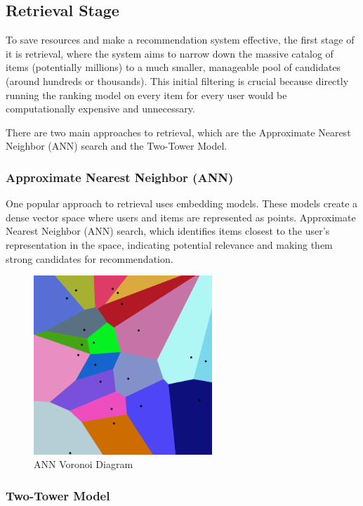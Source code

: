 \subsection{Retrieval Stage}

To save resources and make a recommendation system effective, the first stage of it is retrieval, 
where the system aims to narrow down the massive 
catalog of items (potentially millions) to a much smaller, 
manageable pool of candidates (around hundreds or thousands).
This initial filtering is crucial because 
directly running the ranking model on every item for every 
user would be computationally expensive and unnecessary.

There are two main approaches to retrieval, which are the Approximate Nearest Neighbor (ANN) search and the Two-Tower Model.

\subsubsection{Approximate Nearest Neighbor (ANN)}

One popular approach to retrieval uses embedding models. 
These models create a dense vector space where users and items are represented as points.
Approximate Nearest Neighbor (ANN) search,
which identifies items closest to the user's representation in the space, 
indicating potential relevance and making them strong candidates for recommendation.


\begin{figure}[H]
    \centering
    \includegraphics[width=0.6\textwidth]{assets/ann.png}
    \caption{ANN Voronoi Diagram\cite{AnnVoronoi}}
    \label{fig:AnnVoronoi}
\end{figure}

\subsubsection{Two-Tower Model}

